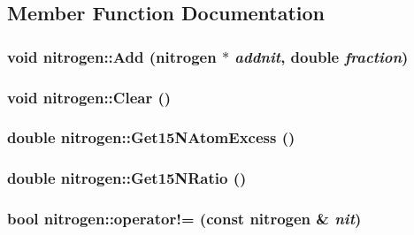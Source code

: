 \subsection{Member Function Documentation}
\hypertarget{classnitrogen_af9cc1e0a8e91d9c879bd677f49520151}{
\subsubsection[{Add}]{\setlength{\rightskip}{0pt plus 5cm}void nitrogen::Add ({\bf nitrogen} $\ast$ {\em addnit}, \/  double {\em fraction})}}
\label{classnitrogen_af9cc1e0a8e91d9c879bd677f49520151}
\hypertarget{classnitrogen_a706b101d934ddb44c4bff07761c8dfef}{
\subsubsection[{Clear}]{\setlength{\rightskip}{0pt plus 5cm}void nitrogen::Clear ()}}
\label{classnitrogen_a706b101d934ddb44c4bff07761c8dfef}
\hypertarget{classnitrogen_ae184f15858c998b17d4f62d772615fba}{
\subsubsection[{Get15NAtomExcess}]{\setlength{\rightskip}{0pt plus 5cm}double nitrogen::Get15NAtomExcess ()}}
\label{classnitrogen_ae184f15858c998b17d4f62d772615fba}
\hypertarget{classnitrogen_ac97f3ebad4801a13a7c444bab3b3a886}{
\subsubsection[{Get15NRatio}]{\setlength{\rightskip}{0pt plus 5cm}double nitrogen::Get15NRatio ()}}
\label{classnitrogen_ac97f3ebad4801a13a7c444bab3b3a886}
\hypertarget{classnitrogen_a94db6c475800d3030ebf24f2eb66e94f}{
\subsubsection[{operator!=}]{\setlength{\rightskip}{0pt plus 5cm}bool nitrogen::operator!= (const {\bf nitrogen} \& {\em nit})}}
